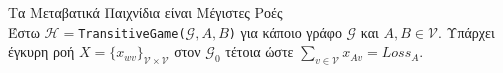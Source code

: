 {}
\begin{lemmagr}{Τα Μεταβατικά Παιχνίδια είναι Μέγιστες Ροές} \ \\
  \label{gameflow}
  Έστω $\mathcal{H} = $\texttt{\textlatin{TransitiveGame}(}$\mathcal{G}, A, B$\texttt{)} για κάποιο γράφο $\mathcal{G}$ και
  $A, B \in \mathcal{V}$. Υπάρχει έγκυρη ροή $X = \{x_{wv}\}_{\mathcal{V} \times \mathcal{V}}$ στον $\mathcal{G}_0$ τέτοια
  ώστε $\sum\limits_{v \in \mathcal{V}}x_{Av} = Loss_A$.
\end{lemmagr}

